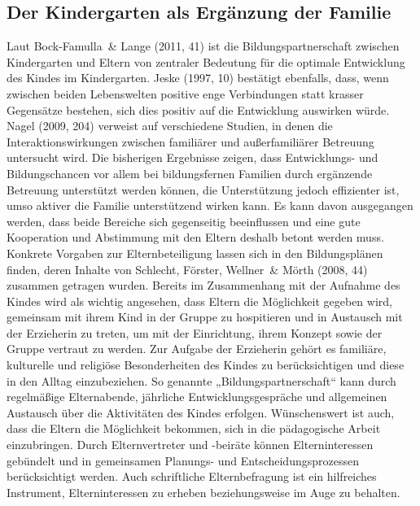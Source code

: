 \subsection{Der Kindergarten als Ergänzung der Familie}
Laut Bock-Famulla~\& Lange (2011, 41) ist die Bildungspartnerschaft zwischen Kindergarten und Eltern von zentraler Bedeutung für die optimale Entwicklung des Kindes im Kindergarten. Jeske (1997, 10) bestätigt ebenfalls, dass, wenn zwischen beiden Lebenswelten positive enge Verbindungen statt krasser Gegensätze bestehen, sich dies positiv auf die Entwicklung auswirken würde. Nagel (2009, 204) verweist auf verschiedene Studien, in denen die Interaktionswirkungen zwischen familiärer und außerfamiliärer Betreuung untersucht wird. Die bisherigen Ergebnisse zeigen, dass Entwicklungs- und Bildungschancen vor allem bei bildungsfernen Familien durch ergänzende Betreuung unterstützt werden können, die Unterstützung jedoch effizienter ist, umso aktiver die Familie unterstützend wirken kann. Es kann davon ausgegangen werden, dass beide Bereiche sich gegenseitig beeinflussen und eine gute Kooperation und Abstimmung mit den Eltern deshalb betont werden muss. Konkrete Vorgaben zur Elternbeteiligung lassen sich in den Bildungsplänen finden, deren Inhalte von Schlecht, Förster, Wellner~\& Mörth (2008, 44) zusammen getragen wurden. Bereits im Zusammenhang mit der Aufnahme des Kindes wird als wichtig angesehen, dass Eltern die Möglichkeit gegeben wird, gemeinsam mit ihrem Kind in der Gruppe zu hospitieren und in Austausch mit der Erzieherin zu treten, um mit der Einrichtung, ihrem Konzept sowie der Gruppe vertraut zu werden. Zur Aufgabe der Erzieherin gehört es familiäre, kulturelle und religiöse Besonderheiten des Kindes zu berücksichtigen und diese in den Alltag einzubeziehen. So genannte „Bildungspartnerschaft“ kann durch regelmäßige Elternabende, jährliche Entwicklungsgespräche und allgemeinen Austausch über die Aktivitäten des Kindes erfolgen. Wünschenswert ist auch, dass die Eltern die Möglichkeit bekommen, sich in die pädagogische Arbeit einzubringen. Durch Elternvertreter und -beiräte können Elterninteressen gebündelt und in gemeinsamen Planungs- und Entscheidungsprozessen berücksichtigt werden. Auch schriftliche Elternbefragung ist ein hilfreiches Instrument, Elterninteressen zu erheben beziehungsweise im Auge zu behalten. 

